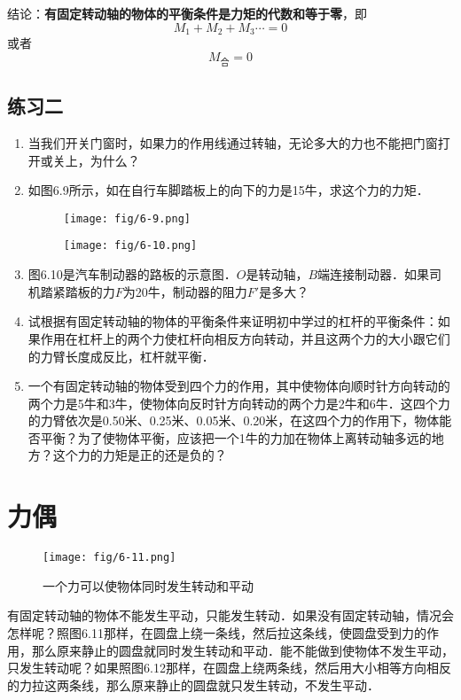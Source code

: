 结论：\textbf{有固定转动轴的物体的平衡条件是力矩的代数和等于零}，即
\[M_1+M_2+M_3\cdots=0 \]
或者
\[M_{\text{合}}=0\]

\subsection*{练习二}

\begin{enumerate}
    \item 当我们开关门窗时，如果力的作用线通过转轴，无论多大的力也不能把门窗打开或关上，为什么？
    \item 如图6.9所示，如在自行车脚踏板上的向下的力是15牛，求这个力的力矩．
    
   \begin{figure}[htp]\centering
   	\begin{minipage}[t]{0.48\textwidth}
   		\centering
   		\texttt{[image: fig/6-9.png]}
   		\caption{}
   	\end{minipage}
   	\begin{minipage}[t]{0.48\textwidth}
   		\centering
   		\texttt{[image: fig/6-10.png]}
   		\caption{}
   	\end{minipage}
   \end{figure}

    \item 图6.10是汽车制动器的路板的示意图．$O$是转动轴，$B$端连接制动器．如果司机踏紧踏板的力$F$为20牛，制动器的阻力$F'$是多大？
    \item 试根据有固定转动轴的物体的平衡条件来证明初中学过的杠杆的平衡条件：如果作用在杠杆上的两个力使杠杆向相反方向转动，并且这两个力的大小跟它们的力臂长度成反比，杠杆就平衡．
    \item 一个有固定转动轴的物体受到四个力的作用，其中使物体向顺时针方向转动的两个力是5牛和3牛，使物体向反时针方向转动的两个力是2牛和6牛．这四个力的力臂依次是0.50米、0.25米、0.05米、0.20米，在这四个力的作用下，物体能否平衡？为了使物体平衡，应该把一个1牛的力加在物体上离转动轴多远的地方？这个力的力矩是正的还是负的？
\end{enumerate}


\section{力偶}
\begin{figure}[htp]
\centering\texttt{[image: fig/6-11.png]}
\caption{一个力可以使物体同时发生转动和平动}
\end{figure}
有固定转动轴的物体不能发生平动，只能发生转动．如果没有固定转动轴，情况会怎样呢？照图6.11那样，在圆盘上绕一条线，然后拉这条线，使圆盘受到力的作用，那么原来静止的圆盘就同时发生转动和平动．能不能做到使物体不发生平动，只发生转动呢？如果照图6.12那样，在圆盘上绕两条线，然后用大小相等方向相反的力拉这两条线，那么原来静止的圆盘就只发生转动，不发生平动．

